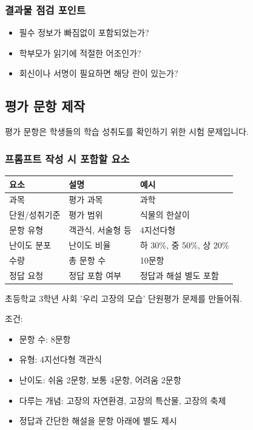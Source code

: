 \documentclass[11pt,a4paper]{article}
\begin{document}
\subsubsection{결과물 점검 포인트}

\begin{itemize}
  \item 필수 정보가 빠짐없이 포함되었는가?
  \item 학부모가 읽기에 적절한 어조인가?
  \item 회신이나 서명이 필요하면 해당 란이 있는가?
\end{itemize}

\newpage

\subsection{평가 문항 제작}

평가 문항은 학생들의 학습 성취도를 확인하기 위한 시험 문제입니다.

\subsubsection{프롬프트 작성 시 포함할 요소}

\begin{center}
\begin{tabular}{|l|l|l|}
\hline
\rowcolor{lightblue}
\textbf{요소} & \textbf{설명} & \textbf{예시} \\
\hline
과목 & 평가 과목 & 과학 \\
\hline
단원/성취기준 & 평가 범위 & 식물의 한살이 \\
\hline
문항 유형 & 객관식, 서술형 등 & 4지선다형 \\
\hline
난이도 분포 & 난이도 비율 & 하 30\%, 중 50\%, 상 20\% \\
\hline
수량 & 총 문항 수 & 10문항 \\
\hline
정답 요청 & 정답 포함 여부 & 정답과 해설 별도 포함 \\
\hline
\end{tabular}
\end{center}

\begin{examplebox}
초등학교 3학년 사회 '우리 고장의 모습' 단원평가 문제를 만들어줘.

조건:
\begin{itemize}[noitemsep]
  \item 문항 수: 8문항
  \item 유형: 4지선다형 객관식
  \item 난이도: 쉬움 2문항, 보통 4문항, 어려움 2문항
  \item 다루는 개념: 고장의 자연환경, 고장의 특산물, 고장의 축제
  \item 정답과 간단한 해설을 문항 아래에 별도 제시
\end{itemize}
\end{examplebox}
\end{document}
